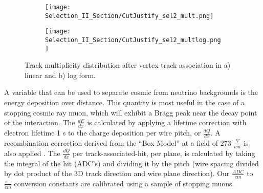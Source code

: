 \begin{figure}[h!]
\centering
  \begin{subfigure}[t]{0.4\textwidth}
    \centering
\texttt{[image: Selection\_II\_Section/CutJustify\_sel2\_mult.png]}
    \caption{ }
  \end{subfigure} 
  \hspace{10 mm}
  \begin{subfigure}[t]{0.4\textwidth}
    \centering
\texttt{[image: Selection\_II\_Section/CutJustify\_sel2\_multlog.png]}
    \caption{ }
  \end{subfigure} 
\caption{ Track multiplicity distribution after vertex-track association in a) linear and b) log form. }
\label{fig:cutjust_sel2_mult}
\end{figure}

\par A variable that can be used to separate cosmic from neutrino backgrounds is the energy deposition over distance.  This quantity is most useful in the case of a stopping cosmic ray muon, which will exhibit a Bragg peak near the decay point of the interaction.  The $\frac{dE}{dx}$ is calculated by applying a lifetime correction with electron lifetime 1 s to the charge deposition per wire pitch, or $\frac{dQ}{dx}$.  A recombination correction derived from the ``Box Model'' at a field of 273 $\frac{V}{cm}$ is also applied \cite{bib:argoneut_recomb}.  The $\frac{dQ}{dx}$ per track-associated-hit, per plane, is calculated by taking the integral of the hit (ADC's) and dividing it by the pitch (wire spacing divided by dot product of the 3D track direction and wire plane direction). Our $\frac{ADC}{cm}$ to $\frac{e^-}{cm}$ conversion constants are calibrated using a sample of stopping muons.
